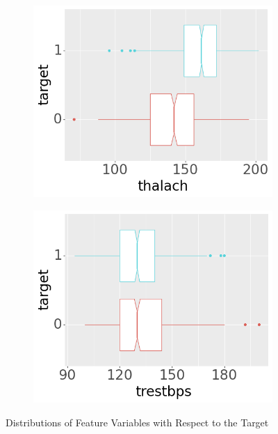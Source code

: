 \begin{figure}[btp]
\begin{subfigure}[b]{0.32\textwidth}
         \includegraphics[width=\textwidth]{plots/target-thalach}
     \end{subfigure}

     \begin{subfigure}[b]{0.32\textwidth}
         \centering
         \includegraphics[width=\textwidth]{plots/target-trestbps}
     \end{subfigure}

     \caption[Figure]{Distributions of Feature Variables with Respect to the Target} \label{fig:subdistributions}
\end{figure}

